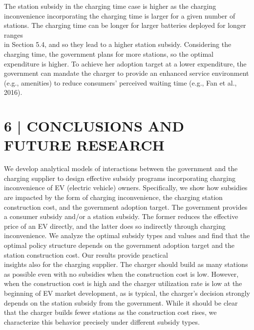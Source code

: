 \documentclass[10pt]{article}
\begin{document}
The station subsidy in the charging time case is higher as the charging inconvenience incorporating the charging time is larger for a given number of stations. The charging time can be longer for larger batteries deployed for longer ranges\\
in Section 5.4, and so they lead to a higher station subsidy. Considering the charging time, the government plans for more stations, so the optimal expenditure is higher. To achieve her adoption target at a lower expenditure, the government can mandate the charger to provide an enhanced service environment (e.g., amenities) to reduce consumers' perceived waiting time (e.g., Fan et al., 2016).

\section*{6 | CONCLUSIONS AND FUTURE RESEARCH}
We develop analytical models of interactions between the government and the charging supplier to design effective subsidy programs incorporating charging inconvenience of EV (electric vehicle) owners. Specifically, we show how subsidies are impacted by the form of charging inconvenience, the charging station construction cost, and the government adoption target. The government provides a consumer subsidy and/or a station subsidy. The former reduces the effective price of an EV directly, and the latter does so indirectly through charging inconvenience. We analyze the optimal subsidy types and values and find that the optimal policy structure depends on the government adoption target and the station construction cost. Our results provide practical\\
insights also for the charging supplier. The charger should build as many stations as possible even with no subsidies when the construction cost is low. However, when the construction cost is high and the charger utilization rate is low at the beginning of EV market development, as is typical, the charger's decision strongly depends on the station subsidy from the government. While it should be clear that the charger builds fewer stations as the construction cost rises, we characterize this behavior precisely under different subsidy types.
\end{document}
